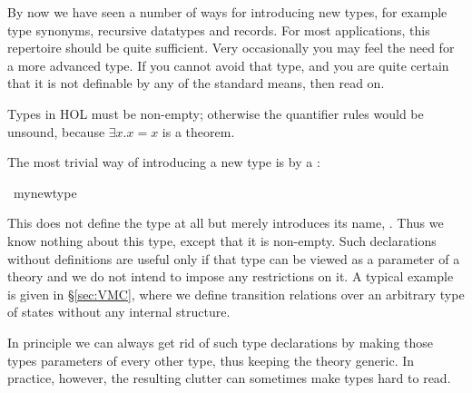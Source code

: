 %
\begin{isabellebody}%
\def\isabellecontext{Typedef}%
%
%
\begin{isamarkuptext}%
\label{sec:adv-typedef}
By now we have seen a number of ways for introducing new types, for example
type synonyms, recursive datatypes and records. For most applications, this
repertoire should be quite sufficient. Very occasionally you may feel the
need for a more advanced type. If you cannot avoid that type, and you are
quite certain that it is not definable by any of the standard means,
then read on.
\begin{warn}
  Types in HOL must be non-empty; otherwise the quantifier rules would be
  unsound, because $\exists x. x=x$ is a theorem.
\end{warn}%
\end{isamarkuptext}%
%
%
\begin{isamarkuptext}%
\label{sec:typedecl}
The most trivial way of introducing a new type is by a :%
\end{isamarkuptext}%
\ my{\isacharunderscore}new{\isacharunderscore}type%
\begin{isamarkuptext}%
\noindent{}%
This does not define the type at all but merely introduces its name, . Thus we know nothing about this type, except that it is
non-empty. Such declarations without definitions are
useful only if that type can be viewed as a parameter of a theory and we do
not intend to impose any restrictions on it. A typical example is given in
\S\ref{sec:VMC}, where we define transition relations over an arbitrary type
of states without any internal structure.

In principle we can always get rid of such type declarations by making those
types parameters of every other type, thus keeping the theory generic. In
practice, however, the resulting clutter can sometimes make types hard to
read.


\end{isamarkuptext}
\end{isabellebody}
